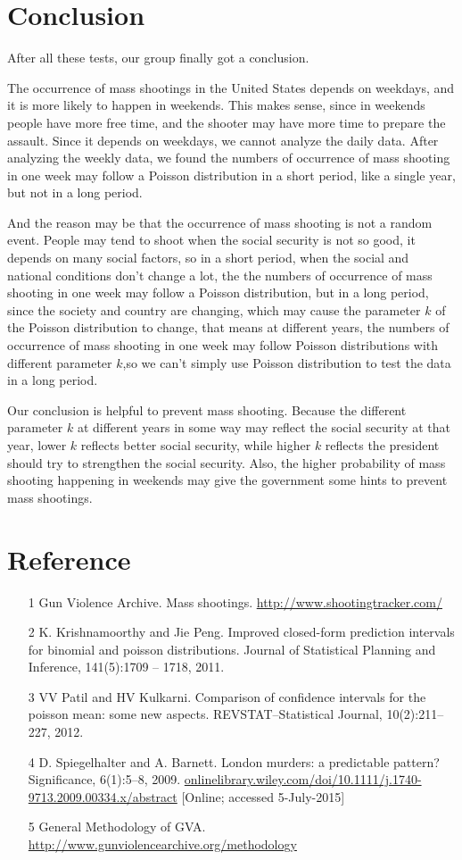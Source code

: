 \documentclass[12pt]{article}
\begin{document}
\section{Conclusion}
After all these tests, our group finally got a conclusion.
\par The occurrence of mass shootings in the United States depends on weekdays, and it is more likely to happen in weekends. This makes sense, since in weekends people have more free time, and the shooter may have more time to prepare the assault. Since it depends on weekdays, we cannot analyze the daily data. After analyzing the weekly data, we found the numbers of occurrence of mass shooting in one week may follow a Poisson distribution in a short period, like a single year, but not in a long period.
\par And the reason may be that the occurrence of mass shooting is not a random event. People may tend to shoot when the social security is not so good, it depends on many social factors, so in a short period, when the social and national conditions don't change a lot, the the numbers of occurrence of mass shooting in one week may follow a Poisson distribution, but in a long period, since the society and country are changing, which may cause the parameter $k$ of the Poisson distribution to change, that means at different years, the numbers of occurrence of mass shooting in one week may follow Poisson distributions with different parameter $k$,so we can't simply use Poisson distribution to test the data in a long period.
\par Our conclusion is helpful to prevent mass shooting. Because the different parameter $k$ at different years in some way may reflect the social security at that year, lower $k$ reflects better social security, while higher $k$ reflects the president should try to strengthen the social security. Also, the higher probability of mass shooting happening in weekends may give the government some hints to prevent mass shootings.
\section{Reference}
\begin{enumerate}[-]
\item [1] Gun Violence Archive. Mass shootings. \url{http://www.shootingtracker.com/}
\item [2] K. Krishnamoorthy and Jie Peng. Improved closed-form prediction intervals for binomial and poisson
distributions. Journal of Statistical Planning and Inference, 141(5):1709 – 1718, 2011.
\item [3] VV Patil and HV Kulkarni. Comparison of confidence intervals for the poisson mean: some new aspects.
REVSTAT–Statistical Journal, 10(2):211–227, 2012.
\item [4] D. Spiegelhalter and A. Barnett. London murders: a predictable pattern? Significance, 6(1):5–8,
2009. \url{onlinelibrary.wiley.com/doi/10.1111/j.1740-9713.2009.00334.x/abstract} [Online;
accessed 5-July-2015]
\item [5] General Methodology of GVA. \url{http://www.gunviolencearchive.org/methodology}
\end{enumerate}
\end{document}
